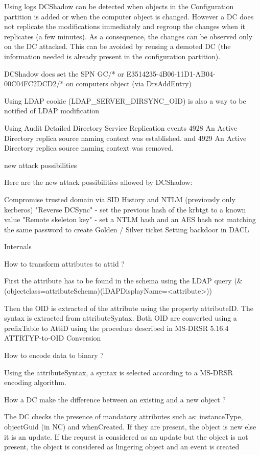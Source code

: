 Using logs DCShadow can be detected when objects in the Configuration partition is added or when the computer object is changed. However a DC does not replicate the modifications immediately and regroup the changes when it replicates (a few minutes). As a consequence, the changes can be observed only on the DC attacked. This can be avoided by reusing a demoted DC (the information needed is already present in the configuration partition).

DCShadow does set the SPN GC/* or E3514235-4B06-11D1-AB04-00C04FC2DCD2/* on computers object (via DrsAddEntry)

Using LDAP cookie (LDAP\_SERVER\_DIRSYNC\_OID) is also a way to be notified of LDAP modification

Using Audit Detailed Directory Service Replication events 4928 An Active Directory replica source naming context was established. and 4929 An Active Directory replica source naming context was removed.

new attack possibilities

Here are the new attack possibilities allowed by DCShadow:

Compromise trusted domain via SID History and NTLM (previously only kerberos)
"Reverse DCSync" - set the previous hash of the krbtgt to a known value
"Remote skeleton key" - set a NTLM hash and an AES hash not matching the same password to create Golden / Silver ticket
Setting backdoor in DACL


Internals

How to transform attributes to attid ?

First the attribute has to be found in the schema using the LDAP query (\&(objectclass=attributeSchema)(lDAPDisplayName=<attribute>))

Then the OID is extracted of the attribute using the property attributeID. The syntax is extracted from attributeSyntax. Both OID are converted using a prefixTable to AttiD using the procedure described in MS-DRSR 5.16.4 ATTRTYP-to-OID Conversion

How to encode data to binary ?

Using the attributeSyntax, a syntax is selected according to a MS-DRSR encoding algorithm.

How a DC make the difference between an existing and a new object ?

The DC checks the presence of mandatory attributes such as: instanceType, objectGuid (in NC) and whenCreated. If they are present, the object is new else it is an update. If the request is considered as an update but the object is not present, the object is considered as lingering object and an event is created

